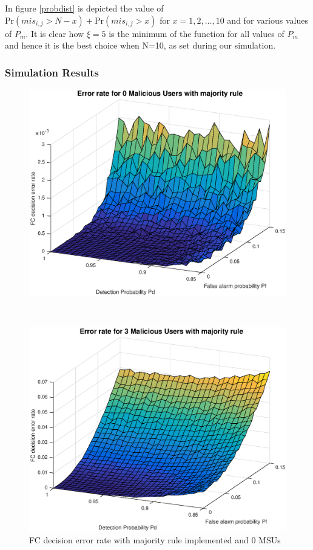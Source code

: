 \documentclass[letterpaper, 10 pt, conference]{ieeeconf}  %
\begin{document}
In figure \ref{probdist} is depicted the value of $\text{Pr} (mis_{i,j}>N-x)+\text{Pr}(mis_{i,j}>x)$ for $x=1,2,\dots,10$ and for various values of $P_m$. It is clear how $\xi=5$ is the minimum of the function for all values of $P_m$ and hence it is the best choice when N=10, as set during our simulation.     
\subsubsection{Simulation Results}

\begin{figure}[t]
    \centering
    \begin{minipage}[t]{0.32 \textwidth}
     \includegraphics[width=\linewidth]{figures/mr0mu.eps}
\caption{FC decision error rate with majority rule implemented and 0 MSUs }\label{mr0}
    \end{minipage}%
    ~ 
    \begin{minipage}[t]{0.32\textwidth}
        \centering
        \includegraphics[width=\linewidth]{figures/mr3mu.eps}

\end{minipage}
\end{figure}
\end{document}
